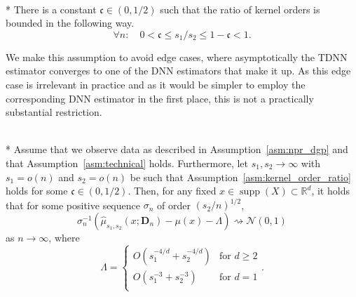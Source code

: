 \begin{boxD}
	\begin{asm}\label{asm:kernel_order_ratio}\mbox{}\\*
		There is a constant $\mathfrak{c} \in (0,1/2)$ such that the ratio of kernel orders is bounded in the following way.
		\begin{equation}
			\forall n: \quad 0 < \mathfrak{c} \leq s_1 / s_2 \leq 1 - \mathfrak{c} < 1.
		\end{equation}
	\end{asm}
\end{boxD}
We make this assumption to avoid edge cases, where asymptotically the TDNN estimator converges to one of the DNN estimators that make it up.
As this edge case is irrelevant in practice and as it would be simpler to employ the corresponding DNN estimator in the first place, this is not a practically substantial restriction.
\begin{boxD}
	\begin{thm}\label{thm:dem3}\mbox{}\\*
		Assume that we observe data as described in Assumption~\ref{asm:npr_dgp} and that Assumption~\ref{asm:technical} holds.
		Furthermore, let $s_1, s_2 \rightarrow \infty$ with $s_1 = o(n)$ and $s_2 = o(n)$ be such that Assumption~\ref{asm:kernel_order_ratio} holds for some $\mathfrak{c} \in (0, 1/2)$.
		Then, for any fixed $x \in \operatorname{supp}(X) \subset \mathbb{R}^d$, it holds that for some positive sequence $\sigma_n$ of order $(s_2/n)^{1/2}$,
		\begin{equation}
			\sigma_n^{-1} \left(\hat{\mu}_{s_1, s_2}\left(x; \mathbf{D}_n\right) - \mu(x) - \Lambda\right) \rightsquigarrow \mathcal{N}(0,1)
		\end{equation}
		as $n \rightarrow \infty$, where
		\begin{equation*}
			\Lambda = \begin{cases}
				O\left(s_1^{-4/d} + s_2^{-4/d}\right) & \text{for } d \geq 2 \\
				O\left(s_1^{-3} + s_2^{-3}\right)     & \text{for } d = 1    \\
			\end{cases} .
		\end{equation*}
	\end{thm}
\end{boxD}

